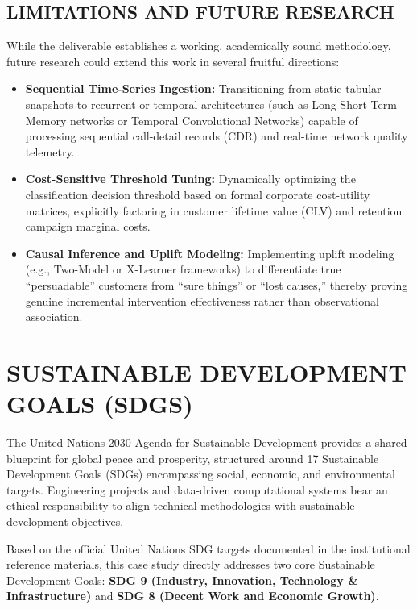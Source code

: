 \documentclass[12pt,a4paper]{report}
\begin{document}
\section{LIMITATIONS AND FUTURE RESEARCH}
While the deliverable establishes a working, academically sound methodology, future research could extend this work in several fruitful directions:
\begin{itemize}
    \item \textbf{Sequential Time-Series Ingestion:} Transitioning from static tabular snapshots to recurrent or temporal architectures (such as Long Short-Term Memory networks or Temporal Convolutional Networks) capable of processing sequential call-detail records (CDR) and real-time network quality telemetry.
    \item \textbf{Cost-Sensitive Threshold Tuning:} Dynamically optimizing the classification decision threshold based on formal corporate cost-utility matrices, explicitly factoring in customer lifetime value (CLV) and retention campaign marginal costs.
    \item \textbf{Causal Inference and Uplift Modeling:} Implementing uplift modeling (e.g., Two-Model or X-Learner frameworks) to differentiate true ``persuadable'' customers from ``sure things'' or ``lost causes,'' thereby proving genuine incremental intervention effectiveness rather than observational association.
\end{itemize}

\chapter{SUSTAINABLE DEVELOPMENT GOALS (SDGS)}

The United Nations 2030 Agenda for Sustainable Development provides a shared blueprint for global peace and prosperity, structured around 17 Sustainable Development Goals (SDGs) encompassing social, economic, and environmental targets. Engineering projects and data-driven computational systems bear an ethical responsibility to align technical methodologies with sustainable development objectives. 

Based on the official United Nations SDG targets documented in the institutional reference materials, this case study directly addresses two core Sustainable Development Goals: \textbf{SDG 9 (Industry, Innovation, Technology \& Infrastructure)} and \textbf{SDG 8 (Decent Work and Economic Growth)}.
\end{document}
